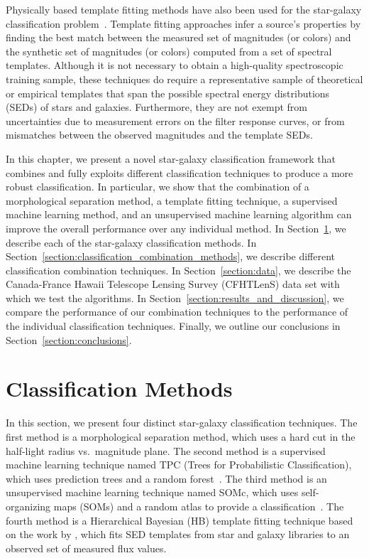 Physically based template fitting methods
have also been used for the star-galaxy classification
problem~\citep{robin2007stellar, Fadely2012}.
Template fitting approaches infer a source's properties
by finding the best match between
the measured set of magnitudes (or colors)
and the synthetic set of magnitudes (or colors)
computed from a set of spectral templates.
Although it is not necessary to obtain
a high-quality spectroscopic training sample,
these techniques do require
a representative sample of theoretical or empirical templates
that span the possible spectral energy distributions (SEDs)
of stars and galaxies.
Furthermore, they are not exempt from uncertainties
due to measurement errors on the filter response curves,
or from mismatches between the observed magnitudes
and the template SEDs.

In this chapter,
we present a novel star-galaxy classification framework
that combines and fully exploits different classification techniques
to produce a more robust classification.
In particular,
we show that the combination of a morphological separation method,
a template fitting technique, a supervised machine learning method,
and an unsupervised machine learning algorithm
can improve the overall performance over any individual method.
In Section~\ref{section:classification_methods},
we describe each of the star-galaxy classification methods.
In Section~\ref{section:classification_combination_methods},
we describe different classification combination techniques.
In Section~\ref{section:data},
we describe the Canada-France Hawaii Telescope Lensing Survey (CFHTLenS)
data set with which we test the algorithms.
In Section~\ref{section:results_and_discussion},
we compare the performance of our combination techniques
to the performance of the individual classification techniques.
Finally, we outline our conclusions in Section~\ref{section:conclusions}.

\section{Classification Methods}
  \label{section:classification_methods}

In this section, we present
four distinct star-galaxy classification techniques.
The first method is a morphological separation method,
which uses a hard cut in the half-light radius vs.\ magnitude plane.
The second method is
a supervised machine learning technique named TPC
(Trees for Probabilistic Classification),
which uses prediction trees and a random forest~\citep{carrascokind2013tpz}.
The third method is
an unsupervised machine learning technique named SOMc,
which uses self-organizing maps (SOMs) and a random atlas
to provide a classification~\citep{carrascokind2014somz}.
The fourth method is
a Hierarchical Bayesian (HB) template fitting technique
based on the work by \citet{Fadely2012},
which fits SED templates from star and galaxy libraries
to an observed set of measured flux values.

